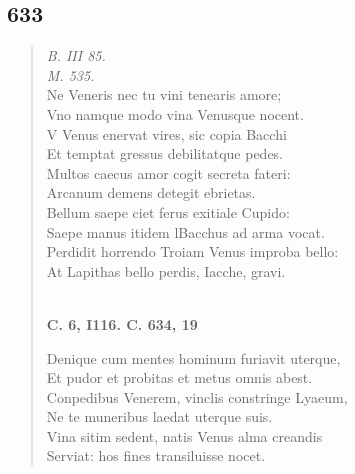 \documentclass[11pt, a4paper]{report}
\begin{document}
            \subsection*{633}
      \begin{verse}
      \textit{B. III 85.} \\ \textit{M. 535.} \\ Ne Veneris nec tu vini tenearis amore; \\ Vno namque modo vina Venusque nocent. \\ V Venus enervat vires, sic copia Bacchi \\ Et temptat gressus debilitatque pedes. \\ Multos caecus amor cogit secreta fateri: \\ Arcanum demens detegit ebrietas. \\ Bellum saepe ciet ferus exitiale Cupido: \\ Saepe manus itidem lBacchus ad arma vocat. \\ Perdidit horrendo Troiam Venus improba bello: \\ At Lapithas bello perdis, Iacche, gravi. \\ 
        ﻿\pagebreak 
    \begin{center} \textbf{C. 6, I116. C. 634, 19} \end{center} \marginpar{[100]} Denique cum mentes hominum furiavit uterque, \\ Et pudor et probitas et metus omnis abest. \\ Conpedibus Venerem, vinclis constringe Lyaeum, \\ Ne te muneribus laedat uterque suis. \\ Vina sitim sedent, natis Venus alma creandis \\ Serviat: hos fines transiluisse nocet. \\ 
      \end{verse}
  
\end{document}

